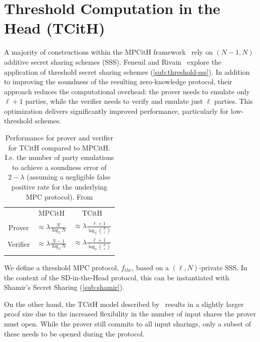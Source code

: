 \documentclass[11pt]{report}
\theoremstyle{definition}
\theoremstyle{plain}
\begin{document}
\section{Threshold Computation in the Head (TCitH)}\label{sec:threshold-mpc}

A majority of constructions within the MPCitH framework~\cite{baum2020concretely,feneuil2022syndrome,katz2018improved} rely on $ (N-1, N) $ additive secret sharing schemes (SSS). Feneuil and Rivain~\cite{feneuil2023threshold,feneuil2023threshold2} explore the application of threshold secret sharing schemes (\autoref{sub:threshold-sss}). In addition to improving the soundness of the resulting zero-knowledge protocol, their approach reduces the computational overhead: the prover needs to emulate only $ \ell + 1 $ parties, while the verifier needs to verify and emulate just $ \ell $ parties. This optimization delivers significantly improved performance, particularly for low-threshold schemes.

\begin{table}[]
  \centering
  \def\arraystretch{1.5}%
  \begin{tabular}{cc|c}
    \textbf{} & MPCitH                                  & TCitH                                                      \\ \arrayrulecolor{darkgray}\hline
    Prover    & $ \approx \lambda \frac{N}{\log_2 N}$   & $ \approx \lambda \frac{\ell + 1}{\log_2 \binom{N}{\ell}}$ \\ \arrayrulecolor{lightgray}\hline
    Verifier  & $ \approx \lambda \frac{N-1}{\log_2 N}$ & $ \approx \lambda \frac{\ell + 1}{\log_2 \binom{N}{\ell}}$ \\ \arrayrulecolor{darkgray}\hline
  \end{tabular}
  \caption{Performance for prover and verifier for TCitH compared to MPCitH. I.e. the number of party emulations to achieve a soundness error of $2-\lambda$ (assuming a negligible false positive rate for the underlying MPC protocol). From \cite{feneuil2023threshold}}\label{tbl:tcith-performance}
\end{table}

We define a threshold MPC protocol, $ f_{thr} $, based on a $ (\ell, N) $-private SSS. In the context of the SD-in-the-Head protocol, this can be instantiated with Shamir's Secret Sharing (\autoref{sub:shamir}).

On the other hand, the TCitH model described by~\cite{feneuil2023threshold} results in a slightly larger proof size due to the increased flexibility in the number of input shares the prover must open. While the prover still commits to all input sharings, only a subset of these needs to be opened during the protocol.
\end{document}
